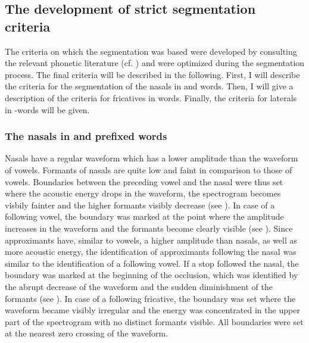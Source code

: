 \subsection{The development of strict segmentation criteria}

The criteria on which the segmentation was based were developed by consulting  the relevant phonetic literature (cf. \citealt{Ladefoged.1996,Johnson.1997b,Ladefoged.2003,Machac.2009,Ladefoged.2011}) and were optimized during the segmentation process. The final criteria will be described in the following. First, I will describe the criteria for the segmentation of the nasals in  and  words. Then, I will give a description of the criteria for fricatives in words. Finally, the criteria for laterals in -words will be given.

\subsubsection{The nasals in  and prefixed words}
Nasals have a regular waveform which has a lower amplitude than the waveform of vowels. Formants of nasals are quite low and faint in comparison to those of vowels. Boundaries between the preceding vowel and the nasal were thus set where the acoustic energy drops in the waveform, the spectrogram becomes visbily fainter and the higher formants visibly decrease (see ). In case of a following vowel, the boundary was marked at the point where the amplitude increases in the waveform and the formants become clearly visible (see ).  Since approximants have, similar to vowels,  a higher amplitude than nasals, as well as more acoustic energy, the identification of approximants following the nasal was similar to the identification of a following vowel. If a stop followed the nasal, the boundary was marked at the beginning of the occlusion, which was identified by the abrupt decrease of the waveform and the sudden diminishment of the formants (see ). In case of a following fricative, the boundary was set where the waveform became visibly irregular and the energy was concentrated in the upper part of the spectrogram with no distinct formants visible. All boundaries were set at the nearest zero crossing of the waveform.



